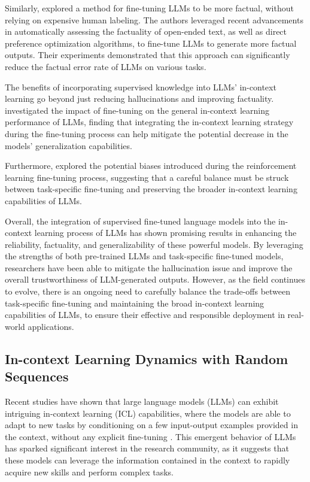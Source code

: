 \documentclass[11pt]{article}
\begin{document}
Similarly, \cite{ref198} explored a method for fine-tuning LLMs to be more factual, without relying on expensive human labeling. The authors leveraged recent advancements in automatically assessing the factuality of open-ended text, as well as direct preference optimization algorithms, to fine-tune LLMs to generate more factual outputs. Their experiments demonstrated that this approach can significantly reduce the factual error rate of LLMs on various tasks.

The benefits of incorporating supervised knowledge into LLMs' in-context learning go beyond just reducing hallucinations and improving factuality. \cite{ref199} investigated the impact of fine-tuning on the general in-context learning performance of LLMs, finding that integrating the in-context learning strategy during the fine-tuning process can help mitigate the potential decrease in the models' generalization capabilities.

Furthermore, \cite{ref200} explored the potential biases introduced during the reinforcement learning fine-tuning process, suggesting that a careful balance must be struck between task-specific fine-tuning and preserving the broader in-context learning capabilities of LLMs.

Overall, the integration of supervised fine-tuned language models into the in-context learning process of LLMs has shown promising results in enhancing the reliability, factuality, and generalizability of these powerful models. By leveraging the strengths of both pre-trained LLMs and task-specific fine-tuned models, researchers have been able to mitigate the hallucination issue and improve the overall trustworthiness of LLM-generated outputs. However, as the field continues to evolve, there is an ongoing need to carefully balance the trade-offs between task-specific fine-tuning and maintaining the broad in-context learning capabilities of LLMs, to ensure their effective and responsible deployment in real-world applications.

\subsection{In-context Learning Dynamics with Random Sequences}

Recent studies have shown that large language models (LLMs) can exhibit intriguing in-context learning (ICL) capabilities, where the models are able to adapt to new tasks by conditioning on a few input-output examples provided in the context, without any explicit fine-tuning \cite{ref194}. This emergent behavior of LLMs has sparked significant interest in the research community, as it suggests that these models can leverage the information contained in the context to rapidly acquire new skills and perform complex tasks.
\end{document}
